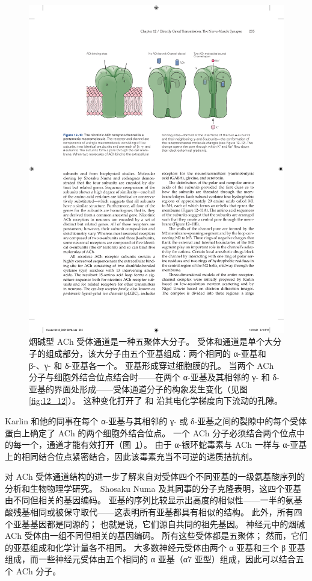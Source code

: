 \begin{figure}[htbp]
	\centering
	\includegraphics[width=0.8\linewidth]{chap12/fig_12_10}
	\caption{烟碱型 ACh 受体通道是一种五聚体大分子。 受体和通道是单个大分子的组成部分，该大分子由五个亚基组成：两个相同的 α-亚基和 β-、γ- 和 δ-亚基各一个。 亚基形成穿过细胞膜的孔。 当两个 ACh 分子与细胞外结合位点结合时——在两个 α-亚基及其相邻的 γ- 和 δ-亚基的界面处形成——受体通道分子的构象发生变化（见图 \ref{fig:12_12}）。 这种变化打开了  和  沿其电化学梯度向下流动的孔隙。}
	\label{fig:12_10}
\end{figure}


Karlin 和他的同事在每个 α-亚基与其相邻的 γ- 或 δ-亚基之间的裂隙中的每个受体蛋白上确定了 ACh 的两个细胞外结合位点。
一个 ACh 分子必须结合两个位点中的每一个，通道才能有效打开（图~\ref{fig:12_10}）。
由于 α-银环蛇毒素与 ACh 一样与 α-亚基上的相同结合位点紧密结合，因此该毒素充当不可逆的递质拮抗剂。


对 ACh 受体通道结构的进一步了解来自对受体四个不同亚基的一级氨基酸序列的分析和生物物理学研究。
Shosaku Numa 及其同事的分子克隆表明，这四个亚基由不同但相关的基因编码。
亚基的序列比较显示出高度的相似性——一半的氨基酸残基相同或被保守取代——这表明所有亚基都具有相似的结构。 
此外，所有四个亚基基因都是同源的；
也就是说，它们源自共同的祖先基因。
神经元中的烟碱 ACh 受体由一组不同但相关的基因编码。
所有这些受体都是五聚体；
然而，它们的亚基组成和化学计量各不相同。
大多数神经元受体由两个 α 亚基和三个 β 亚基组成，而一些神经元受体由五个相同的 α 亚基（α7 亚型）组成，因此可以结合五个 ACh 分子。


